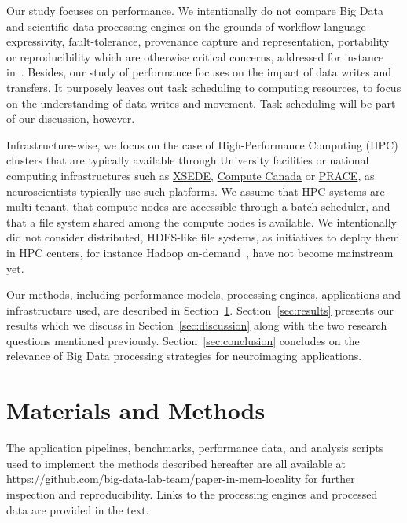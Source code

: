 \documentclass{IEEEtran}
\newcommand{\todo}[1]{\marginpar{\parbox{18mm}{\flushleft\tiny\color{red}\textbf{TODO}:
      #1}}}
\begin{document}
Our study focuses on performance. We intentionally do not 
compare Big Data and scientific data processing engines on the grounds 
of workflow language expressivity, fault-tolerance, provenance capture 
and representation, portability or reproducibility which are otherwise 
critical concerns, addressed for instance in~\cite{samba}. Besides, our 
study of performance focuses on the impact of data writes and 
transfers. It purposely leaves out task scheduling to computing 
resources, to focus on the understanding of 
data writes and movement. Task scheduling will be part of our 
discussion, however.

Infrastructure-wise, we focus on the case of High-Performance Computing 
(HPC) clusters that are typically available through University 
facilities or national computing infrastructures such as 
\href{xsede.org}{XSEDE}, \href{http://computecanada.ca}{Compute Canada} 
or \href{http://www.prace-ri.eu}{PRACE}, as neuroscientists typically use such platforms.
 We assume that HPC systems are 
multi-tenant, that compute nodes are accessible through a batch 
scheduler, and that a file system shared among the compute nodes is 
available. We intentionally did not consider distributed, 
HDFS-like file systems, as initiatives to deploy them in HPC 
centers, for instance Hadoop on-demand~\cite{krishnan2011myhadoop}, have not 
become mainstream yet.


Our methods, including performance models, processing engines, 
applications and infrastructure used, are described in 
Section~\ref{sec:methods}. Section~\ref{sec:results} presents our 
results which we discuss in Section~\ref{sec:discussion} along with the 
two research questions mentioned previously. 
Section~\ref{sec:conclusion} concludes on the relevance of Big Data 
processing strategies for neuroimaging applications.

\section{Materials and Methods} %
\label{sec:methods}

The application pipelines, benchmarks, performance data, and analysis scripts used 
to implement the methods described hereafter are all available at 
\url{https://github.com/big-data-lab-team/paper-in-mem-locality} for 
further inspection and reproducibility. Links to the processing engines 
and processed data are provided in the text.
\end{document}
